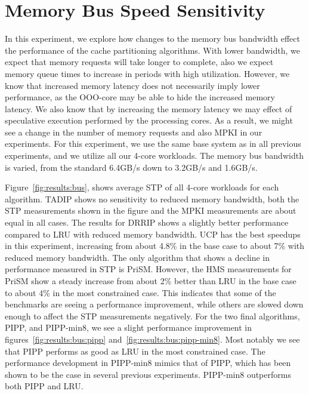 \section{Memory Bus Speed Sensitivity}
\label{sec:results:bus_sensitivity}

In this experiment, we explore how changes to the memory bus bandwidth effect the performance of the cache partitioning algorithms.
With lower bandwidth, we expect that memory requests will take longer to complete, also we expect memory queue times to increase in periods with high utilization.
However, we know that increased memory latency does not necessarily imply lower performance, as the OOO-core may be able to hide the increased memory latency.
We also know that by increasing the memory latency we may effect of speculative execution performed by the processing cores.
As a result, we might see a change in the number of memory requests and also MPKI in our experiments.
For this experiment, we use the same base system as in all previous experiments, and we utilize all our 4-core workloads.
The memory bus bandwidth is varied, from the standard 6.4GB/s down to 3.2GB/s and 1.6GB/s.

Figure~\ref{fig:results:bus}, shows average STP of all 4-core workloads for each algorithm.
TADIP shows no sensitivity to reduced memory bandwidth, both the STP measurements shown in the figure and the MPKI measurements are about equal in all cases.
The results for DRRIP shows a slightly better performance compared to LRU with reduced memory bandwidth.
UCP has the best speedups in this experiment, increasing from about 4.8\% in the base case to about 7\% with reduced memory bandwidth.
The only algorithm that shows a decline in performance measured in STP is PriSM.
However, the HMS measurements for PriSM show a steady increase from about 2\% better than LRU in the base case to about 4\% in the most constrained case.
This indicates that some of the benchmarks are seeing a performance improvement, while others are slowed down enough to affect the STP measurements negatively.
For the two final algorithms, PIPP, and PIPP-min8, we see a slight performance improvement in figures~\ref{fig:results:bus:pipp} and~\ref{fig:results:bus:pipp-min8}. 
Most notably we see that PIPP performs as good as LRU in the most constrained case.
The performance development in PIPP-min8 mimics that of PIPP, which has been shown to be the case in several previous experiments.
PIPP-min8 outperforms both PIPP and LRU.


